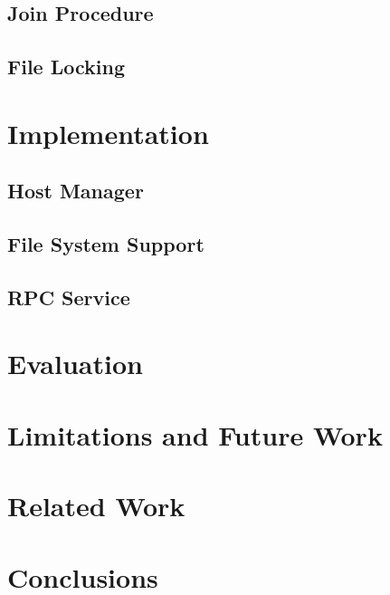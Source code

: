 \documentclass[letterpaper,twocolumn,10pt]{article}
\begin{document}
%    

\subsection{Join Procedure}
\label{sec:joinProcedure}


\subsection{File Locking}
\label{sec:fileLocking}


\section{Implementation}
\label{sec:implementation}


\subsection{Host Manager}
\label{sec:hostManager}


\subsection{File System Support}
\label{sec:fsSupport}


\subsection{RPC Service}
\label{sec:rpcService}


\section{Evaluation}
\label{sec:evaluation}


\section{Limitations and Future Work}
\label{sec:limitations}


\section{Related Work}
\label{sec:relatedWork}


\section{Conclusions}


{\footnotesize 
}

\theendnotes
\end{document}
